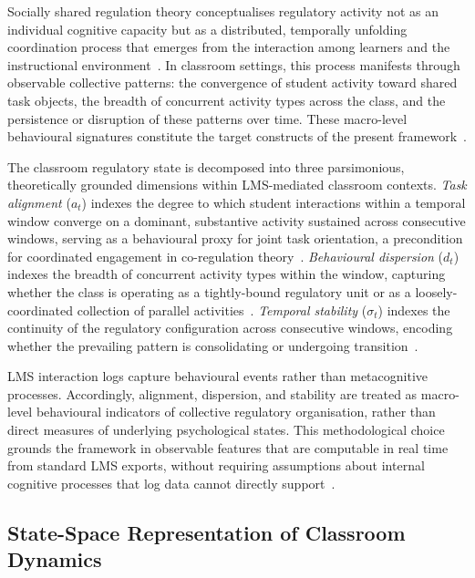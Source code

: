\documentclass[preprint,12pt,authoryear]{elsarticle}
\begin{document}
Socially shared regulation theory conceptualises regulatory activity not as an individual cognitive capacity but as a distributed, temporally unfolding coordination process that emerges from the interaction among learners and the instructional environment~\citep{hadwin2018}. In classroom settings, this process manifests through observable collective patterns: the convergence of student activity toward shared task objects, the breadth of concurrent activity types across the class, and the persistence or disruption of these patterns over time. These macro-level behavioural signatures constitute the target constructs of the present framework~\citep{isohatala2020, malmberg2017}.

The classroom regulatory state is decomposed into three parsimonious, theoretically grounded dimensions within LMS-mediated classroom contexts. \textit{Task alignment} ($a_t$) indexes the degree to which student interactions within a temporal window converge on a dominant, substantive activity sustained across consecutive windows, serving as a behavioural proxy for joint task orientation, a precondition for coordinated engagement in co-regulation theory~\citep{malmberg2017}. \textit{Behavioural dispersion} ($d_t$) indexes the breadth of concurrent activity types within the window, capturing whether the class is operating as a tightly-bound regulatory unit or as a loosely-coordinated collection of parallel activities~\citep{fredricks2004, reschly2012, bergdahl2022}. \textit{Temporal stability} ($\sigma_t$) indexes the continuity of the regulatory configuration across consecutive windows, encoding whether the prevailing pattern is consolidating or undergoing transition~\citep{molenaar2014, reimann2009, jarvela2021}.

LMS interaction logs capture behavioural events rather than metacognitive processes. Accordingly, alignment, dispersion, and stability are treated as macro-level behavioural indicators of collective regulatory organisation, rather than direct measures of underlying psychological states. This methodological choice grounds the framework in observable features that are computable in real time from standard LMS exports, without requiring assumptions about internal cognitive processes that log data cannot directly support~\citep{jarvela2021b, saint2023}.

\subsection{State-Space Representation of Classroom Dynamics}
\label{sec:framework_dynamics}
\end{document}
